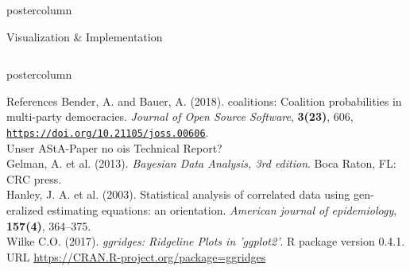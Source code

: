 \documentclass[final,hyperref={pdfpagelabels=false}]{beamer}
\begin{document}
\begin{frame}
\begin{columns}
\begin{column}{1\textwidth}
\begin{columns}[T]
\begin{column}{.484\textwidth}
\begin{beamercolorbox}[center,wd=\textwidth]{postercolumn}
\begin{minipage}[T]{.95\textwidth}
\begin{block}{\footnotesize Visualization \& Implementation}
%
\end{block}


\end{minipage}
\end{beamercolorbox}
\end{column}

\begin{column}{.016\textwidth}
\end{column}

\end{columns}


\vspace{2ex}
\begin{beamercolorbox}[center,wd=\textwidth]{postercolumn}
\begin{minipage}[T]{.95\textwidth}  %
\begin{block}{\footnotesize References}
{\footnotesize
Bender, A. and Bauer, A. (2018). coalitions: Coalition probabilities in multi-party democracies.
\textit{Journal of Open Source Software}, \textbf{3(23)}, 606,
\href{https://doi.org/10.21105/joss.00606}{\texttt{https://doi.org/10.21105/joss.00606}}. \\
Unser AStA-Paper no ois Technical Report? \\
Gelman, A. et al. (2013). \textit{Bayesian Data Analysis, 3rd edition}. Boca Raton, FL: CRC press. \\
Hanley, J. A. et al. (2003). Statistical analysis of correlated data using gen-
eralized estimating equations: an orientation. \textit{American journal of epidemiology},
\textbf{157(4)}, 364--375. \\
Wilke C.O. (2017). \textit{ggridges: Ridgeline Plots in 'ggplot2'}. R package version
0.4.1. URL \href{https://CRAN.R-project.org/package=ggridges}{https://CRAN.R-project.org/package=ggridges}
}
\end{block}
\end{minipage}
\end{beamercolorbox}

\end{column} %
\end{columns}
\end{frame}
\end{document}
